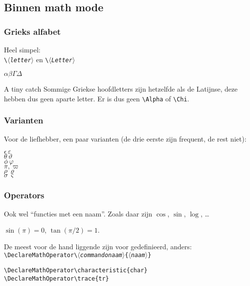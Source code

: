 \subsection{Binnen math mode}
\begin{frame}[fragile]
  \frametitle{Grieks alfabet}

  Heel simpel:\\
  \texttt{\textbackslash$\langle$\textsl{letter}$\rangle$} en \texttt{\textbackslash$\langle$\textsl{Letter}$\rangle$}

  \begin{LTXexample}
$\alpha\beta\Gamma\Delta$
  \end{LTXexample}

  \begin{alertblock}{A tiny catch}
    Sommige Griekse hoofdletters zijn hetzelfde als de Latijnse, deze hebben dus geen aparte letter. Er is dus geen \verb|\Alpha| of \verb|\Chi|.
  \end{alertblock}
\end{frame}

\begin{frame}[fragile]
  \frametitle{Varianten}

  Voor de liefhebber, een paar varianten (de drie eerste zijn frequent, de rest niet):

  \begin{LTXexample}
$\epsilon\,\varepsilon$ \\
$\theta\,\vartheta$ \\
$\phi\,\varphi$ \\
$\pi,\varpi$ \\
$\rho\,\varrho$ \\
$\sigma\,\varsigma$
  \end{LTXexample}
\end{frame}

\begin{frame}[fragile]
  \frametitle{Operators}

  Ook wel ``functies met een naam''. Zoals daar zijn $\cos$, $\sin$, $\log$, \ldots

  \begin{LTXexample}
$\sin(\pi)=0$,
$\tan(\pi/2)=1$.
  \end{LTXexample}

  De meest voor de hand liggende zijn voor gedefinieerd, anders: \\
  \texttt{\textcolor{uagreen}{\textbackslash DeclareMathOperator}\textbackslash\textsl{$\langle$commandonaam$\rangle$}\{\textsl{$\langle$naam$\rangle$}\}}
  \begin{verbatim}
\DeclareMathOperator\characteristic{char}
\DeclareMathOperator\trace{tr}
\end{verbatim}
\end{frame}

